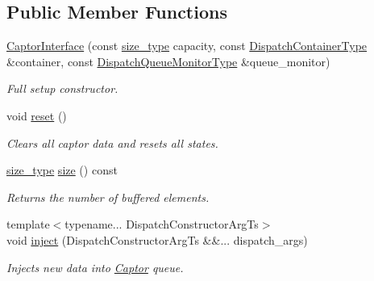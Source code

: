 \subsection*{Public Member Functions}
\begin{DoxyCompactItemize}
\item 
\hyperlink{classflow_1_1_captor_interface_adf956268fd1859bf44c886dc76dadb0b}{Captor\+Interface} (const \hyperlink{classflow_1_1_captor_interface_a62db6a158eebcb377e63ede6a1f1a8c6}{size\+\_\+type} capacity, const \hyperlink{classflow_1_1_captor_interface_a887171bf3b12d8232922a81844ea9a7d}{Dispatch\+Container\+Type} \&container, const \hyperlink{classflow_1_1_captor_interface_a6624ec49c575e3a4c2730be405afe179}{Dispatch\+Queue\+Monitor\+Type} \&queue\+\_\+monitor)
\begin{DoxyCompactList}\small\item\em Full setup constructor. \end{DoxyCompactList}\item 
\mbox{\label{classflow_1_1_captor_interface_a78be2f5226c40ef04347d095548b8607}} 
void \hyperlink{classflow_1_1_captor_interface_a78be2f5226c40ef04347d095548b8607}{reset} ()
\begin{DoxyCompactList}\small\item\em Clears all captor data and resets all states. \end{DoxyCompactList}\item 
\mbox{\label{classflow_1_1_captor_interface_a1a4b3f7f6c1bd16a2cb672d90a1cbbc0}} 
\hyperlink{classflow_1_1_captor_interface_a62db6a158eebcb377e63ede6a1f1a8c6}{size\+\_\+type} \hyperlink{classflow_1_1_captor_interface_a1a4b3f7f6c1bd16a2cb672d90a1cbbc0}{size} () const
\begin{DoxyCompactList}\small\item\em Returns the number of buffered elements. \end{DoxyCompactList}\item 
{\footnotesize template$<$typename... Dispatch\+Constructor\+Arg\+Ts$>$ }\\void \hyperlink{classflow_1_1_captor_interface_a2a7e884dff7564478a6ae060b37351f0}{inject} (Dispatch\+Constructor\+Arg\+Ts \&\&... dispatch\+\_\+args)
\begin{DoxyCompactList}\small\item\em Injects new data into \hyperlink{classflow_1_1_captor}{Captor} queue. \end{DoxyCompactList}\item 

\end{DoxyCompactItemize}
